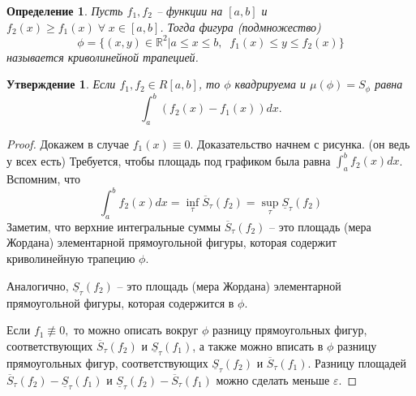 \documentclass{article}
\theoremstyle{plain}
\newtheorem{claim}{Утверждение}
\newtheorem{definition}{Определение}
\theoremstyle{definition}
\theoremstyle{remark}
\renewcommand{\*}{\cdot}
\begin{document}
\begin{definition}
Пусть $f_1, f_2$ -- функции на $[a,b]$ и $f_2(x) \geq f_1(x) \;\forall\; x\in [a, b]$. Тогда фигура (подмножество)
$$\phi = \{(x, y) \in \mathbb{R}^2 | a\leq x\leq b, \;\; f_1(x)\leq y \leq f_2(x) \}$$ называется криволинейной трапецией.
\end{definition}

\begin{claim}
Если $f_1, f_2 \in R[a, b]$, то $\phi$ квадрируема и $\mu(\phi) = S_{\phi}$ равна 
$$\int_a^b (f_2(x) - f_1(x))dx.$$


\end{claim}

\begin{proof}
Докажем в случае $f_1(x) \equiv 0.$ Доказательство начнем с рисунка. (он ведь у всех есть) Требуется, чтобы площадь под графиком была равна $\int_a^b f_2(x)dx$. Вспомним, что 
$$\int_a^b f_2(x)dx = \inf_{\tau}\overline{S}_{\tau}(f_2) = \sup_{\tau}\underline{S}_{\tau}(f_2)$$
Заметим, что верхние интегральные суммы $\overline{S}_{\tau}(f_2)$ -- это площадь (мера Жордана) элементарной прямоугольной фигуры, которая содержит криволинейную трапецию $\phi$.

Аналогично, $\underline{S}_{\tau}(f_2)$ -- это площадь (мера Жордана) элементарной прямоугольной фигуры, которая содержится в $\phi$. 

Если $f_1 \not\equiv 0,$ то можно описать вокруг $\phi$ разницу прямоугольных фигур, соответствующих $\overline{S}_{\tau}(f_2)$ и $\underline{S}_{\tau}(f_1)$, а также можно вписать в $\phi$ разницу прямоугольных фигур, соответствующих $\underline{S}_{\tau}(f_2)$ и $\overline{S}_{\tau}(f_1)$.
Разницу площадей
$\overline{S}_{\tau}(f_2) - \underline{S}_{\tau}(f_1)$ и  $\underline{S}_{\tau}(f_2) - \overline{S}_{\tau}(f_1)$ можно сделать меньше $\varepsilon$. %

\end{proof}
\end{document}
